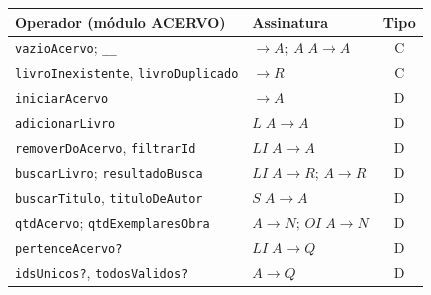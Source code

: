\documentclass[a4paper,12pt]{article}
\begin{document}
\begin{center}
\small
\begin{tabularx}{\linewidth}{@{}Y l c@{}}
\toprule
Operador (módulo ACERVO) & Assinatura & Tipo \\
\midrule
\texttt{vazioAcervo}; \texttt{\_\_} & $\to A$; $A\;A\to A$ & C \\
\texttt{livroInexistente}, \texttt{livroDuplicado} & $\to R$ & C \\
\texttt{iniciarAcervo} & $\to A$ & D \\
\texttt{adicionarLivro} & $L\;A\to A$ & D \\
\texttt{removerDoAcervo}, \texttt{filtrarId} & $LI\;A\to A$ & D \\
\texttt{buscarLivro}; \texttt{resultadoBusca} & $LI\;A\to R$; $A\to R$ & D \\
\texttt{buscarTitulo}, \texttt{tituloDeAutor} & $S\;A\to A$ & D \\
\texttt{qtdAcervo}; \texttt{qtdExemplaresObra} & $A\to N$; $OI\;A\to N$ & D \\
\texttt{pertenceAcervo?} & $LI\;A\to Q$ & D \\
\texttt{idsUnicos?}, \texttt{todosValidos?} & $A\to Q$ & D \\
\bottomrule
\end{tabularx}
\end{center}
\end{document}
